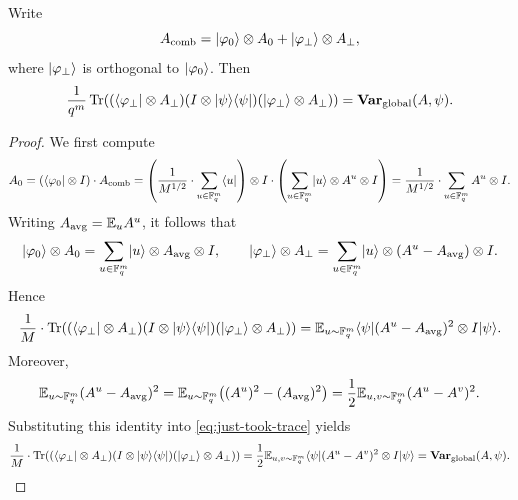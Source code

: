 \begin{lemma}\label{lem:global-rewrite}
	\leanok
	Write
	\[
		A_{\mathrm{comb}} = \lvert \varphi_0 \rangle \otimes A_0 + \lvert \varphi_\perp \rangle \otimes A_\perp,
	\]
	where $\lvert \varphi_\perp \rangle$ is orthogonal to $\lvert \varphi_0 \rangle$. Then
	\[
		\frac{1}{q^m}\operatorname{Tr}((\langle \varphi_\perp \rvert\otimes A_\perp)(I\otimes \lvert \psi \rangle\langle \psi \rvert)(\lvert \varphi_\perp \rangle\otimes A_\perp))
		= \mathbf{Var}_{\mathrm{global}}(A,\psi).
	\]
\end{lemma}
\begin{proof}
	\leanok
	We first compute
	\[
		A_0
		=
		(\langle \varphi_0 \rvert\otimes I)\cdot A_{\mathrm{comb}}
		=
		\left(\frac{1}{M^{1/2}} \cdot \sum_{u \in \mathbb{F}_q^m} \langle u \rvert\right) \otimes I \cdot \left(\sum_{u \in \mathbb{F}_q^m} \lvert u \rangle \otimes A^u \otimes I\right)
		=
		\frac{1}{M^{1/2}} \cdot \sum_{u \in \mathbb{F}_q^m} A^u \otimes I.
	\]
	Writing $A_{\mathrm{avg}}=\mathbb{E}_u A^u$, it follows that
	\[
		\lvert \varphi_0 \rangle\otimes A_0
		=
		\sum_{u \in \mathbb{F}_q^m} \lvert u \rangle \otimes A_{\mathrm{avg}} \otimes I,
		\qquad
		\lvert \varphi_\perp \rangle\otimes A_\perp
		=
		\sum_{u \in \mathbb{F}_q^m} \lvert u \rangle \otimes (A^u-A_{\mathrm{avg}}) \otimes I.
	\]
	Hence
	\begin{equation}
		\frac{1}{M} \cdot \operatorname{Tr}((\langle \varphi_\perp \rvert\otimes A_\perp)(I\otimes \lvert \psi \rangle\langle \psi \rvert)(\lvert \varphi_\perp \rangle\otimes A_\perp))
		=
		\mathbb{E}_{u \sim \mathbb{F}_q^m} \langle \psi \rvert (A^u-A_{\mathrm{avg}})^2 \otimes I \lvert \psi \rangle.
		\label{eq:just-took-trace}
	\end{equation}
	Moreover,
	\[
		\mathbb{E}_{u \sim \mathbb{F}_q^m}(A^u-A_{\mathrm{avg}})^2
		=
		\mathbb{E}_{u \sim \mathbb{F}_q^m}\bigl((A^u)^2-(A_{\mathrm{avg}})^2\bigr)
		=
		\frac12 \mathbb{E}_{u,v \sim \mathbb{F}_q^m} (A^u-A^v)^2.
	\]
	Substituting this identity into \eqref{eq:just-took-trace} yields
	\[
		\frac{1}{M} \cdot \operatorname{Tr}((\langle \varphi_\perp \rvert\otimes A_\perp)(I\otimes \lvert \psi \rangle\langle \psi \rvert)(\lvert \varphi_\perp \rangle\otimes A_\perp))
		=
		\frac12 \mathbb{E}_{u,v \sim \mathbb{F}_q^m} \langle \psi \rvert (A^u-A^v)^2 \otimes I \lvert \psi \rangle
		=
		\mathbf{Var}_{\mathrm{global}}(A,\psi).
	\]
\end{proof}

